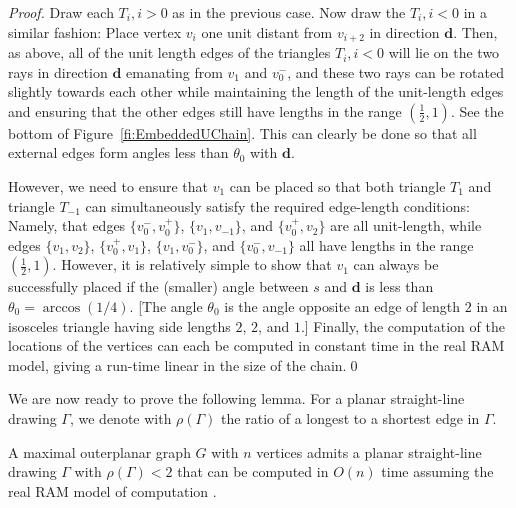 \documentclass[orivec]{llncs}
\begin{document}
\begin{proof}
Draw each $T_i, i > 0$ as in the previous case. Now draw the $T_i, i < 0$ in a similar fashion: Place vertex $v_i$  one unit distant from $v_{i+2}$ in direction $\mathbf{d}$. Then, as above,
all of the unit length edges of the triangles $T_i, i < 0$ will lie on the two rays in direction
$\mathbf{d}$ emanating from $v_1$ and $v_0^-$, and these two rays can be rotated slightly towards each other while maintaining the length of the unit-length edges and ensuring that the other edges still have lengths in the range $(\frac{1}{2}, 1)$.
See the bottom of Figure~\ref{fi:EmbeddedUChain}.
This can clearly be done so that all external edges form angles less than $\theta_0$ with $\mathbf{d}$.

However, we need to ensure that $v_1$ can be placed so that both triangle $T_1$ and triangle $T_{-1}$ can simultaneously satisfy the required edge-length conditions:
Namely, that edges
$\{v_0^-, v_0^+ \}$, $\{v_1, v_{-1} \}$, and $\{v_0^+, v_2 \}$ are all unit-length, while edges
$\{v_1, v_2 \}$, $\{v_0^+, v_1 \}$, $\{v_1, v_0^- \}$, and $\{v_0^-, v_{-1} \}$ all have lengths in the range $(\frac{1}{2}, 1)$.
However, it is relatively simple to show that $v_1$ can always be successfully placed if the (smaller) angle between $s$ and $\mathbf{d}$ is less than
$\theta_0 = \arccos(1/4)$. [The angle $\theta_0$ is the angle opposite an edge of length $2$ in an isosceles triangle having side lengths $2$, $2$, and $1$.]
Finally, the computation of the locations of the vertices can each be computed in constant time in the real RAM model, giving a run-time linear in the size of the chain.\qed
\end{proof}

We are now ready to prove the following lemma. For a planar straight-line drawing $\Gamma$, we denote with $\rho(\Gamma)$ the ratio of a longest to a shortest edge in $\Gamma$.

\begin{lemma}\label{le:upper-bound}
  A maximal outerplanar graph $G$ with $n$ vertices admits a planar straight-line drawing $\Gamma$ with $\rho(\Gamma) < 2$ that can be computed in $O(n)$ time assuming the real RAM model of computation .
\end{lemma}
\end{document}
